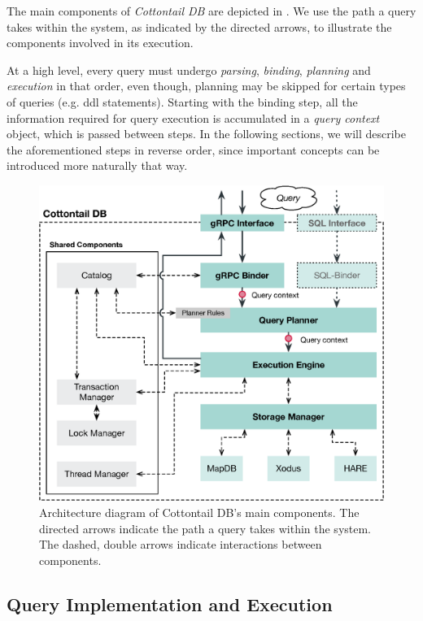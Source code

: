 The main components of \emph{Cottontail DB} are depicted in . We use the path a query takes within the system, as indicated by the directed arrows, to illustrate the components involved in its execution.

At a high level, every query must undergo \emph{parsing}, \emph{binding}, \emph{planning} and \emph{execution} in that order, even though, planning may be skipped for certain types of queries (e.g. \acrshort{ddl} statements). Starting with the binding step, all the information required for query execution is accumulated in a \emph{query context} object, which is passed between steps. In the following sections, we will describe the aforementioned steps in reverse order, since important concepts can be introduced more naturally that way.

\begin{figure}[bt]
    \centering
    \includegraphics[width=\textwidth]{figures/architecture.eps}
    \caption{Architecture diagram of Cottontail DB's main components. The directed arrows indicate the path a query takes within the system. The dashed, double arrows indicate interactions between components.}
    \label{figure:cottontail_architecture}
\end{figure}


\subsection{Query Implementation and Execution}


